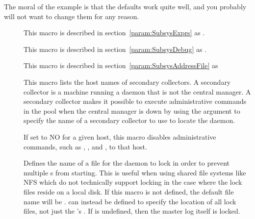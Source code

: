 The moral of the example is that 
the defaults work quite well, and you probably 
will not want to change them for any reason.
\begin{description}

\item[] \label{param:MasterExprs} This macro is
  described in section~\ref{param:SubsysExprs} as
  .

\item[] \label{param:MasterDebug} This macro
  is described in section~\ref{param:SubsysDebug} as
  .

\item[] \label{param:MasterAddressFile}
  This macro is described in
  section~\ref{param:SubsysAddressFile} as

\item[]
  \label{param:SecondaryCollectorList} This macro lists the host names
  of secondary collectors.  A secondary collector is a machine
  running a  daemon that is not the central manager.
  A secondary collector makes it possible to execute administrative
  commands in the pool when the central manager is down by using the
   argument to specify the name of a secondary collector to
  use to locate the  daemon.

\item[]
  \label{param:AllowAdminCommands} If set to NO for a given host, this
  macro disables administrative commands, such as 
  , , and , to that host.

\item[] \label{param:MasterInstanceLock}
  Defines the name of a file for the  daemon
  to lock in order to prevent multiple s
  from starting.
  This is useful when using shared file systems like NFS which do
  not technically support locking in the case where the lock files
  reside on a local disk.
  If this macro is not defined, the default file name will be
  .
   can instead be defined to
  specify the location of all lock files, not just the 
  's .
  If  is undefined, then the master log itself is locked.


\end{description}


